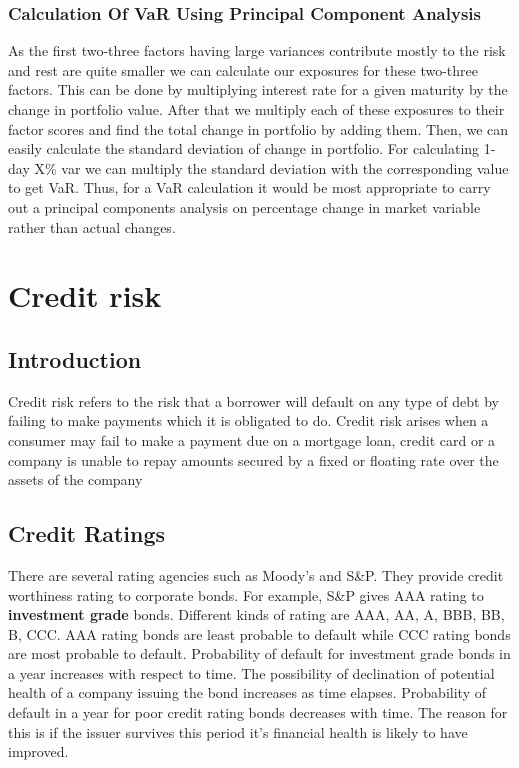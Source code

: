 \documentclass[11pt]{article}
\numberwithin{equation}{section}
\begin{document}
\subsubsection{Calculation Of VaR Using Principal Component Analysis}
\medskip

As the first two-three factors having large variances contribute mostly to the risk and rest are quite smaller we can calculate our exposures for these two-three factors. This can be done by multiplying interest rate for a given maturity by the change in portfolio value. After that we multiply each of these exposures to their factor scores and find the total change in portfolio by adding them. Then, we can easily calculate the standard deviation of change in portfolio. For calculating 1-day X\% var we can multiply the standard deviation with the corresponding value to get VaR. Thus, for a VaR calculation it would be most appropriate to carry out a principal components analysis on percentage change in market variable rather than actual changes.  

\pagebreak
\section{Credit risk}
\medskip

\subsection{Introduction}
\medskip

Credit risk refers to the risk that a borrower will default on any type of debt by failing to make payments which it is obligated to do. Credit risk arises when a consumer may fail to make a payment due on a mortgage loan, credit card or a company is unable to repay amounts secured by a fixed or floating rate  over the assets of the company

\subsection{Credit Ratings}
\medskip

There are several rating agencies such as Moody's and S\&P. They provide credit worthiness rating to corporate bonds. For example, S\&P gives AAA rating to \textbf{investment grade} bonds. Different kinds of rating are AAA, AA, A, BBB, BB, B, CCC. AAA rating bonds are least probable to default while CCC rating bonds are most probable to default. Probability of default for investment grade bonds in a year increases with respect to time. The possibility of declination of potential health of a company issuing the bond increases as time elapses. Probability of default in a year for poor credit rating bonds decreases with time. The reason for this is if the issuer survives this period it's financial health is likely to have improved. 
\end{document}
